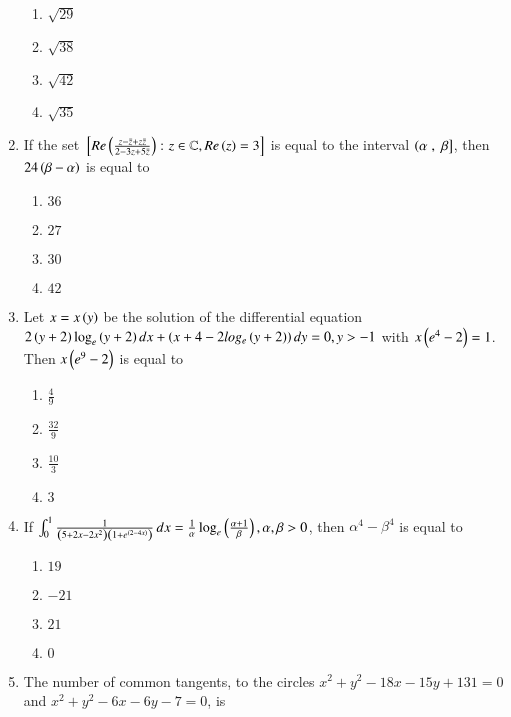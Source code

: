 \documentclass[journal,onecolumn]{IEEEtran}
\theoremstyle{remark}
\begin{document}
\begin{enumerate}
	\begin{enumerate}
		\item $\sqrt{29}$ 
		\item $\sqrt{38}$ 
		\item $\sqrt{42}$ 
		\item $\sqrt{35}$ 
	\end{enumerate}

    \item If the set ${}\left[Re\left(\frac{z - \bar{z} + z\bar{z}}{2 - 3z + 5\bar{z}}\right) \colon z \in \mathbb{C}, Re\left(z\right) = 3\right]$ is equal to the interval $\left(\alpha\right., {}\left.\beta\right]$, then $24\left(\beta - \alpha\right)$ is equal to 

	\begin{enumerate}
		\item $36$ 
		\item $27$
		\item $30$
		\item $42$
	\end{enumerate}

    \item Let $x = x\left(y\right)$ be the solution of the differential equation $2\left(y + 2\right)\log_{e}\left(y + 2\right) dx + \left(x + 4 - 2log_{e}\left(y + 2\right)\right) dy = 0, y > -1$ with $x\left(e^4 - 2\right) = 1$. Then $x\left(e^9 - 2\right)$ is equal to

	\begin{enumerate}
		\item $\frac{4}{9}$
		\item $\frac{32}{9}$
		\item $\frac{10}{3}$
		\item $3$
	\end{enumerate}

    \item If $\int_{0}^{1} \frac{1}{\left(5 + 2x - 2x^2\right)\left(1 + e^{\left(2 - 4x\right)}\right)} \, dx = \frac{1}{\alpha}\log_{e}\left(\frac{\alpha + 1}{\beta}\right), \alpha, \beta > 0$, then $\alpha^4 - \beta^4$ is equal to

	\begin{enumerate}
		\item $19$ 
		\item $-21$
		\item $21$
		\item $0$
	\end{enumerate}


    \item The number of common tangents, to the circles $x^2 + y^2 - 18x - 15y + 131 = 0$ and $x^2 + y^2  - 6x - 6y - 7 = 0$, is


\end{enumerate}
\end{document}
